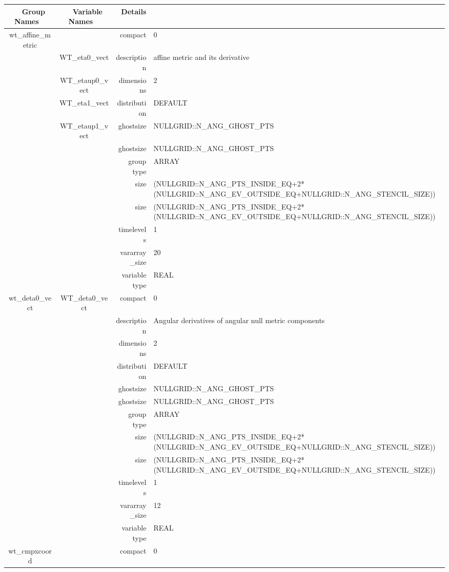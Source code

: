 \begin{tabular*}{150mm}{|c|c@{\extracolsep{\fill}}|rl|} \hline 
~ {\bf Group Names} ~ & ~ {\bf Variable Names} ~  &{\bf Details} ~ & ~ \\ 
\hline 
wt\_affine\_metric &  & compact & 0 \\ 
 & WT\_eta0\_vect & description & affine metric and its derivative \\ 
 & WT\_etaup0\_vect & dimensions & 2 \\ 
 & WT\_eta1\_vect & distribution & DEFAULT \\ 
 & WT\_etaup1\_vect & ghostsize & NULLGRID::N\_ANG\_GHOST\_PTS \\ 
& ~ & ghostsize & NULLGRID::N\_ANG\_GHOST\_PTS \\ 
 &  & group type & ARRAY \\ 
 &  & size & (NULLGRID::N\_ANG\_PTS\_INSIDE\_EQ+2*(NULLGRID::N\_ANG\_EV\_OUTSIDE\_EQ+NULLGRID::N\_ANG\_STENCIL\_SIZE)) \\ 
& ~ & size & (NULLGRID::N\_ANG\_PTS\_INSIDE\_EQ+2*(NULLGRID::N\_ANG\_EV\_OUTSIDE\_EQ+NULLGRID::N\_ANG\_STENCIL\_SIZE)) \\ 
 &  & timelevels & 1 \\ 
 &  & vararray\_size & 20 \\ 
 &  & variable type & REAL \\ 
\hline 
wt\_deta0\_vect & WT\_deta0\_vect & compact & 0 \\ 
 &  & description & Angular derivatives of angular null metric components \\ 
 &  & dimensions & 2 \\ 
 &  & distribution & DEFAULT \\ 
 &  & ghostsize & NULLGRID::N\_ANG\_GHOST\_PTS \\ 
& ~ & ghostsize & NULLGRID::N\_ANG\_GHOST\_PTS \\ 
 &  & group type & ARRAY \\ 
 &  & size & (NULLGRID::N\_ANG\_PTS\_INSIDE\_EQ+2*(NULLGRID::N\_ANG\_EV\_OUTSIDE\_EQ+NULLGRID::N\_ANG\_STENCIL\_SIZE)) \\ 
& ~ & size & (NULLGRID::N\_ANG\_PTS\_INSIDE\_EQ+2*(NULLGRID::N\_ANG\_EV\_OUTSIDE\_EQ+NULLGRID::N\_ANG\_STENCIL\_SIZE)) \\ 
 &  & timelevels & 1 \\ 
 &  & vararray\_size & 12 \\ 
 &  & variable type & REAL \\ 
\hline 
wt\_cmpxcoord &  & compact & 0 \\ 

\end{tabular*}
